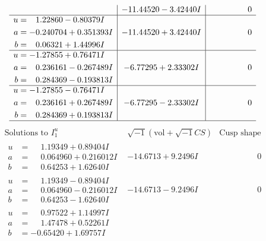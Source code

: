 \documentclass[1p]{elsarticle_modified}
\theoremstyle{definition}
\newcommand{\I}{\sqrt{-1}}
\begin{document}
$$\begin{array}{c|c|c}
 & -11.44520 - 3.42440 I & \phantom{-0.000000 } 0 \\ \hline\begin{aligned}
u &= \phantom{-}1.22860 - 0.80379 I \\
a &= -0.240704 + 0.351393 I \\
b &= \phantom{-}0.06321 + 1.44996 I\end{aligned}
 & -11.44520 + 3.42440 I & \phantom{-0.000000 } 0 \\ \hline\begin{aligned}
u &= -1.27855 + 0.76471 I \\
a &= \phantom{-}0.236161 - 0.267489 I \\
b &= \phantom{-}0.284369 - 0.193813 I\end{aligned}
 & -6.77295 + 2.33302 I & \phantom{-0.000000 } 0 \\ \hline\begin{aligned}
u &= -1.27855 - 0.76471 I \\
a &= \phantom{-}0.236161 + 0.267489 I \\
b &= \phantom{-}0.284369 + 0.193813 I\end{aligned}
 & -6.77295 - 2.33302 I & \phantom{-0.000000 } 0\\
 \hline 
 \end{array}$$\newpage$$\begin{array}{c|c|c}  
\text{Solutions to }I^u_{1}& \I (\text{vol} + \sqrt{-1}CS) & \text{Cusp shape}\\
 \hline 
\begin{aligned}
u &= \phantom{-}1.19349 + 0.89404 I \\
a &= \phantom{-}0.064960 + 0.216012 I \\
b &= \phantom{-}0.64253 + 1.62640 I\end{aligned}
 & -14.6713 + 9.2496 I & \phantom{-0.000000 } 0 \\ \hline\begin{aligned}
u &= \phantom{-}1.19349 - 0.89404 I \\
a &= \phantom{-}0.064960 - 0.216012 I \\
b &= \phantom{-}0.64253 - 1.62640 I\end{aligned}
 & -14.6713 - 9.2496 I & \phantom{-0.000000 } 0 \\ \hline\begin{aligned}
u &= \phantom{-}0.97522 + 1.14997 I \\
a &= \phantom{-}1.47478 + 0.52261 I \\
b &= -0.65420 + 1.69757 I\end{aligned}

\end{array}$$
\end{document}
